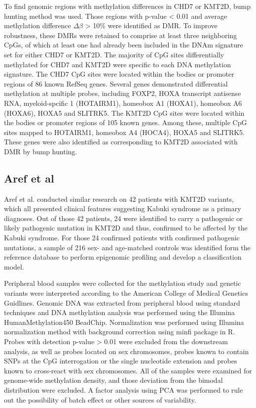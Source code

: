To find genomic regions with methylation differences in CHD7 or KMT2D, bump hunting method was used. Those regions with p-value < 0.01 and average methylation difference $\Delta \beta$ > 10\% were identified as DMR. To improve robustness, these DMRs were retained to comprise at least three neighboring CpGs, of which at least one had already been included in the DNAm signature set for either CHD7 or KMT2D. The majority of CpG sites differentially methylated for CHD7 and KMT2D were specific to each DNA methylation signature. The CHD7 CpG sites were located within the bodies or promoter regions of 86 known RefSeq genes. Several genes demonstrated differential methylation at multiple probes, including FOXP2, HOXA transcript antisense RNA, myeloid-spcific 1 (HOTAIRM1), homeobox A1 (HOXA1), homeobox A6 (HOXA6), HOXA5 and SLITRK5. The KMT2D CpG sites were located within the bodies or promoter regions of 105 known genes. Among these, multiple CpG sites mapped to HOTAIRM1, homeobox A4 (HOCA4), HOXA5 and SLITRK5. These genes were also identified as corresponding to KMT2D associated with DMR by bump hunting.



\subsection{Aref et al}
Aref et al. \cite{aref2017defining} conducted similar research on 42 patients with KMT2D variants, which all presented clinical features suggesting Kabuki syndrome as a primary diagnoses. Out of those 42 patients, 24 were identified to carry a pathogenic or likely pathogenic mutation in KMT2D and thus, confirmed to be affected by the Kabuki syndrome. For those 24 confirmed patients with confirmed pathogenic mutations, a sample of 216 sex- and age-matched controls was identified form the reference database to perform epigenomic profiling and develop a classification model.

Peripheral blood samples were collected for the methylation study and genetic variants were interpreted according to the American College of Medical Genetics Guidlines. Genomic DNA was extracted from peripheral blood using standard techniques and DNA methylation analysis was performed using the Illumina HumanMethylation450 BeadChip. Normalization was performed using Illumina normalization method with background correction using minfi package in R. Probes with detection p-value > 0.01 were excluded from the downstream analysis, as well as probes located on sex chromosomes, probes known to contain SNPs at the CpG interrogation or the single nucleotide extension and probes known to cross-react with sex chromosomes. All of the samples were examined for genome-wide methylation density, and those deviation from the bimodal distribution were excluded. A factor analysis using PCA was performed to rule out the possibility of batch effect or other sources of variability.

